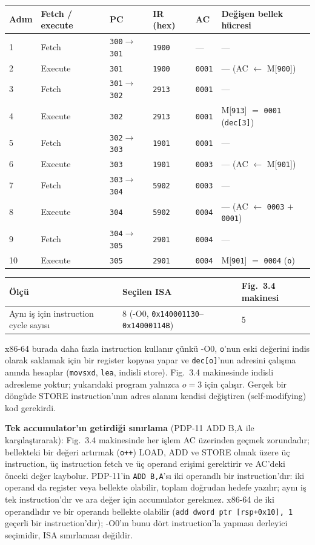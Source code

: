 \documentclass[11pt,a4paper]{article}
\newcommand{\tl}{\texttt}
\newcommand{\hd}[1]{\cellcolor{hdr}#1}
\begin{document}
\begin{longtable}{|p{1.0cm}|p{2.2cm}|p{2.2cm}|p{1.8cm}|p{1.6cm}|p{5.0cm}|}
\hline
\hd{Adım} & \hd{Fetch / execute} & \hd{PC} & \hd{IR (hex)} & \hd{AC} & \hd{Değişen bellek hücresi}\\
\hline
\endhead
1 & Fetch & \tl{300}$\to$\tl{301} & \tl{1900} & --- & ---\\ \hline
2 & Execute & \tl{301} & \tl{1900} & \tl{0001} & --- (AC $\leftarrow$ M[\tl{900}])\\ \hline
3 & Fetch & \tl{301}$\to$\tl{302} & \tl{2913} & \tl{0001} & ---\\ \hline
4 & Execute & \tl{302} & \tl{2913} & \tl{0001} & M[\tl{913}] $=$ \tl{0001} (\tl{dec[3]})\\ \hline
5 & Fetch & \tl{302}$\to$\tl{303} & \tl{1901} & \tl{0001} & ---\\ \hline
6 & Execute & \tl{303} & \tl{1901} & \tl{0003} & --- (AC $\leftarrow$ M[\tl{901}])\\ \hline
7 & Fetch & \tl{303}$\to$\tl{304} & \tl{5902} & \tl{0003} & ---\\ \hline
8 & Execute & \tl{304} & \tl{5902} & \tl{0004} & --- (AC $\leftarrow$ \tl{0003} $+$ \tl{0001})\\ \hline
9 & Fetch & \tl{304}$\to$\tl{305} & \tl{2901} & \tl{0004} & ---\\ \hline
10 & Execute & \tl{305} & \tl{2901} & \tl{0004} & M[\tl{901}] $=$ \tl{0004} (\tl{o})\\ \hline
\end{longtable}

\begin{longtable}{|p{8.0cm}|p{3.6cm}|p{3.6cm}|}
\hline
\hd{Ölçü} & \hd{Seçilen ISA} & \hd{Fig.~3.4 makinesi}\\
\hline
Aynı iş için instruction cycle sayısı & 8 (-O0, \tl{0x140001130}--\tl{0x14000114B}) & 5\\
\hline
\end{longtable}

x86-64 burada daha fazla instruction kullanır çünkü -O0, \tl{o}'nun eski değerini indis olarak
saklamak için bir register kopyası yapar ve \tl{dec[o]}'nun adresini çalışma anında hesaplar
(\tl{movsxd}, \tl{lea}, indisli store). Fig.~3.4 makinesinde indisli adresleme yoktur; yukarıdaki
program yalnızca $o = 3$ için çalışır. Gerçek bir döngüde STORE instruction'ının adres alanını
kendisi değiştiren (self-modifying) kod gerekirdi.

\textbf{Tek accumulator'ın getirdiği sınırlama} (PDP-11 ADD B,A ile karşılaştırarak): Fig.~3.4
makinesinde her işlem AC üzerinden geçmek zorundadır; bellekteki bir değeri artırmak (\tl{o++})
LOAD, ADD ve STORE olmak üzere üç instruction, üç instruction fetch ve üç operand erişimi
gerektirir ve AC'deki önceki değer kaybolur. PDP-11'in \tl{ADD B,A}'sı iki operandlı bir
instruction'dır: iki operand da register veya bellekte olabilir, toplam doğrudan hedefe yazılır;
aynı iş tek instruction'dır ve ara değer için accumulator gerekmez. x86-64 de iki operandlıdır
ve bir operandı bellekte olabilir (\tl{add dword ptr [rsp+0x10], 1} geçerli bir instruction'dır);
-O0'ın bunu dört instruction'la yapması derleyici seçimidir, ISA sınırlaması değildir.
\end{document}
